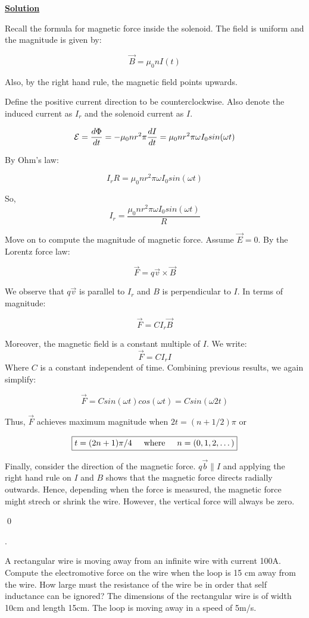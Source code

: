 \documentclass{article}
\newcommand{\new}[1]{
    \vspace{2mm}
    \noindent
    \textbf{
    \underline{#1}}
}
\newcounter{problemcnt}
\newcommand{\Problem}{{
    \vspace{5mm}
    \stepcounter{problemcnt}
    \noindent
    \arabic{problemcnt}. 
}
}
\begin{document}
\new{Solution}
Recall the formula for magnetic force inside the solenoid. 
The field is uniform and the magnitude is given by:

\[
    \vec{B} = \mu_0nI(t)
\]

Also, by the right hand rule, the magnetic field points upwards. 

Define the positive current direction to be counterclockwise. Also 
denote the induced current as $I_r$ and the solenoid current as 
$I$. 

\[
    {\mathcal{E}} = \frac{d\Phi}{dt}
    =
    -\mu_0 n r^2 \pi \frac{dI}{dt}
    = 
 \mu_0 n r^2 \pi \omega I_0 sin(\omega t)
\]

By Ohm's law:

\[
    I_rR = 
 \mu_0 n r^2 \pi \omega I_0 sin(\omega t)
\]

So, 
\[
    \boxed {
    I_r = \frac{ \mu_0 n r^2 \pi \omega I_0 sin(\omega t)}{R}
    }
\]

Move on to compute the magnitude of magnetic force. Assume 
$\vec{E} = 0$. By the Lorentz force law:

\[
    \vec{F} = q\vec{v} \times \vec{B}
\]

We observe that $q\vec{v}$ is parallel to $I_r$ and $B$ is 
perpendicular to $I$. In terms of magnitude:

\[
    \vec{F} = CI_r\vec{B}
\]

Moreover, the magnetic field is a constant multiple of $I$. 
We write:
\[
    \vec{F} = CI_rI
\]
Where $C$ is a constant independent of time. Combining previous results, 
we again simplify:

\[
    \vec{F} = Csin(\omega t) cos(\omega t)
    = Csin(\omega 2t)
\]

Thus, $\vec{F}$ achieves maximum magnitude when $2t = (n+1/2)\pi$ 
or 

\[
    \boxed{
    t = (2n+1)\pi/4 \hspace{5mm}\textrm{where}\hspace{5mm} n = (0, 1, 2, \dots)
    }
    \]

Finally, consider the direction of the magnetic force. 
$q\vec{b} \parallel I$ and applying the right hand rule on 
$I$ and $B$ shows that the magnetic force directs radially outwards. 
Hence, depending when the force is measured, the magnetic force 
might strech or shrink the wire. However, the vertical force will 
always be zero. 

\qed

\Problem
A rectangular wire is moving away from an infinite wire with current 
100A. Compute the electromotive force on the wire when the loop 
is 15 cm away from the wire. How large must the resistance of the wire 
be in order that self inductance can be ignored? The dimensions of 
the rectangular wire is of width 10cm and length 15cm. The loop is moving 
away in a speed of 5m/s. 
\end{document}
